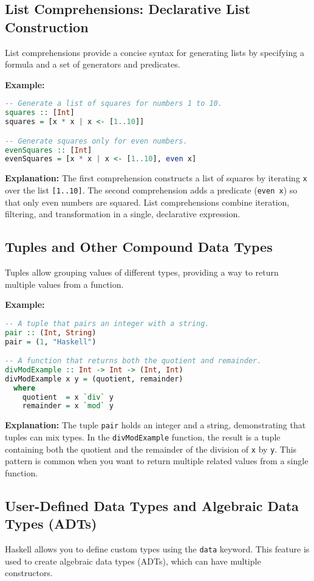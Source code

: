 \documentclass[11pt,a4paper]{article}
\begin{document}
\subsection{List Comprehensions: Declarative List Construction}
List comprehensions provide a concise syntax for generating lists by specifying a formula and a set of generators and predicates.

\textbf{Example:}
\begin{lstlisting}[language=Haskell]
-- Generate a list of squares for numbers 1 to 10.
squares :: [Int]
squares = [x * x | x <- [1..10]]

-- Generate squares only for even numbers.
evenSquares :: [Int]
evenSquares = [x * x | x <- [1..10], even x]
\end{lstlisting}

\textbf{Explanation:}  
The first comprehension constructs a list of squares by iterating \texttt{x} over the list \texttt{[1..10]}. The second comprehension adds a predicate (\texttt{even x}) so that only even numbers are squared. List comprehensions combine iteration, filtering, and transformation in a single, declarative expression.

\subsection{Tuples and Other Compound Data Types}
Tuples allow grouping values of different types, providing a way to return multiple values from a function.

\textbf{Example:}
\begin{lstlisting}[language=Haskell]
-- A tuple that pairs an integer with a string.
pair :: (Int, String)
pair = (1, "Haskell")

-- A function that returns both the quotient and remainder.
divModExample :: Int -> Int -> (Int, Int)
divModExample x y = (quotient, remainder)
  where
    quotient  = x `div` y
    remainder = x `mod` y
\end{lstlisting}

\textbf{Explanation:}  
The tuple \texttt{pair} holds an integer and a string, demonstrating that tuples can mix types. In the \texttt{divModExample} function, the result is a tuple containing both the quotient and the remainder of the division of \texttt{x} by \texttt{y}. This pattern is common when you want to return multiple related values from a single function.

\subsection{User-Defined Data Types and Algebraic Data Types (ADTs)}
Haskell allows you to define custom types using the \texttt{data} keyword. This feature is used to create algebraic data types (ADTs), which can have multiple constructors.
\end{document}
